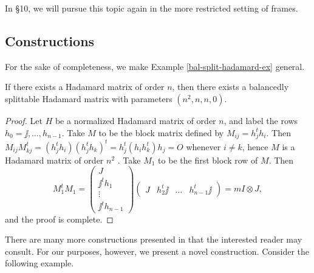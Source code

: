 \documentclass[../../../main]{subfiles}
\begin{document}
In \S10, we will pursue this topic again in the more restricted setting of frames.

\dinkus

\subsection{Constructions}

For the sake of completeness, we make Example \ref{bal-split-hadamard-ex} general.

\begin{prop}
If there exists a Hadamard matrix of order $n$, then there exists a balancedly splittable Hadamard matrix with parameters $(n^2,n,n,0)$.
\end{prop}

\begin{proof}
 Let $H$ be a normalized Hadamard matrix of order $n$, and label the rows $h_0=\jj, \dots, h_{n-1}$. Take $M$ to be the block matrix defined by $M_{ij}=h_j^th_i$. Then $M_{ij}M_{kj}^t=(h_j^th_i)(h_j^th_k)^t=h_j^t(h_ih_k^t)h_j=O$ whenever $i \neq k$, hence $M$ is a Hadamard matrix of order $n^2$ \cite[cf][]{kharaghani-auxiliary}. Take $M_1$ to be the first block row of $M$. Then
 \[
  M_1^tM_1=\begin{pmatrix}J \\ \jj^th_1 \\ \vdots \\ \jj^th_{n-1} \end{pmatrix}\begin{pmatrix}J & h_2^t\jj & \dots & h_{n-1}^t\jj\end{pmatrix}
  =mI \otimes J,
 \]
 and the proof is complete.
\end{proof}

There are many more constructions presented in \cite{splittable-hadamard} that the interested reader may consult. For our purposes, however, we present a novel construction. Consider the following example.
\end{document}
